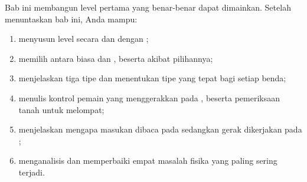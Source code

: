 \begin{tujuanbox}
Bab ini membangun level pertama yang benar-benar dapat dimainkan. Setelah
menuntaskan bab ini, Anda mampu:
\begin{enumerate}
  \item menyusun level secara  dan dengan
        ;
  \item memilih antara  biasa dan ,
        beserta akibat pilihannya;
  \item menjelaskan tiga tipe  dan menentukan tipe yang tepat
        bagi setiap benda;
  \item menulis kontrol pemain yang menggerakkan  pada
        , beserta pemeriksaan tanah untuk melompat;
  \item menjelaskan mengapa masukan dibaca pada  sedangkan gerak
        dikerjakan pada ;
  \item menganalisis dan memperbaiki empat masalah fisika yang paling sering
        terjadi.
\end{enumerate}
\end{tujuanbox}
